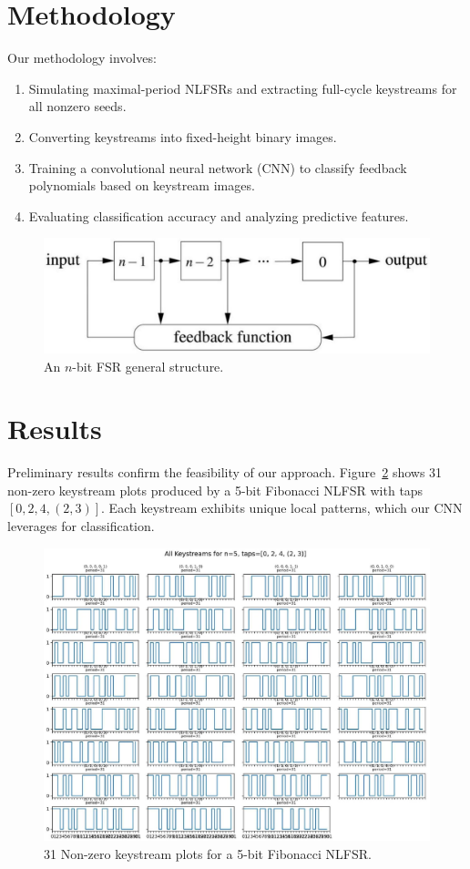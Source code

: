\documentclass[conference]{IEEEtran}
\begin{document}
\section{Methodology}
Our methodology involves:
\begin{enumerate}
  \item Simulating maximal-period NLFSRs and extracting full-cycle keystreams for all nonzero seeds.
  \item Converting keystreams into fixed-height binary images.
  \item Training a convolutional neural network (CNN) to classify feedback polynomials based on keystream images.
  \item Evaluating classification accuracy and analyzing predictive features.
\end{enumerate}

\begin{figure}[ht]
  \centering
  \includegraphics[max width=\columnwidth]{block_diagram.jpg}
  \caption{An $n$-bit FSR general structure.}
  \label{fig:block_diagram}
\end{figure}

\section{Results}
Preliminary results confirm the feasibility of our approach. Figure~\ref{fig:keystreams} shows 31 non-zero keystream plots produced by a 5-bit Fibonacci NLFSR with taps $[0,2,4,(2,3)]$. Each keystream exhibits unique local patterns, which our CNN leverages for classification.

\begin{figure}[ht]
  \centering
  \includegraphics[max width=\columnwidth]{keystreams.jpg}
  \caption{31 Non-zero keystream plots for a 5-bit Fibonacci NLFSR.}
  \label{fig:keystreams}
\end{figure}
\end{document}

